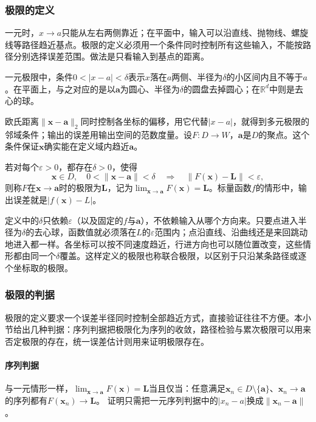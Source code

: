 \subsubsection{极限的定义}
\label{sec:multivariable-joint-limits}

一元时，$x\to a$只能从左右两侧靠近；在平面中，输入可以沿直线、抛物线、螺旋线等路径趋近基点。极限的定义必须用一个条件同时控制所有这些输入，不能按路径分别选择误差范围。做法是只看输入到基点的距离。

一元极限中，条件$0<|x-a|<\delta$表示$x$落在$a$两侧、半径为$\delta$的小区间内且不等于$a$。在平面上，与之对应的是以$\bm a$为圆心、半径为$\delta$的圆盘去掉圆心；在$\mathbb R^d$中则是去心的球。

欧氏距离$\lVert\bm x-\bm a\rVert_2$同时控制各坐标的偏移，用它代替$|x-a|$，就得到多元极限的邻域条件；输出的误差用输出空间的范数度量。设$F:D\to W$，$\bm a$是$D$的聚点。这个条件保证$\bm x$确实能在定义域内趋近$\bm a$。
\begin{definition}[映射的极限]
\label{def:multivariable-limit}
若对每个$\varepsilon>0$，都存在$\delta>0$，使得
\[
 \bm x\in D,\quad 0<\lVert\bm x-\bm a\rVert<\delta
 \quad\Longrightarrow\quad \lVert F(\bm x)-\bm L\rVert<\varepsilon,
\]
则称$F$在$\bm x\to\bm a$时的极限为$\bm L$，记为$\lim_{\bm x\to\bm a}F(\bm x)=\bm L$。标量函数$f$的情形中，输出误差就是$|f(\bm x)-L|$。
\end{definition}
定义中的$\delta$只依赖$\varepsilon$（以及固定的$f$与$\bm a$），不依赖输入从哪个方向来。只要点进入半径为$\delta$的去心球，函数值就必须落在$L$的$\varepsilon$范围内；点沿直线、沿曲线还是来回跳动地进入都一样。各坐标可以按不同速度趋近，行进方向也可以随位置改变，这些情形都由同一个$\delta$覆盖。这样定义的极限也称联合极限，以区别于只沿某条路径或逐个坐标取的极限。

\subsubsection{极限的判据}
\label{sec:multivariable-limit-criteria}

极限的定义要求一个误差半径同时控制全部趋近方式，直接验证往往不方便。本小节给出几种判据：序列判据把极限化为序列的收敛，路径检验与累次极限可以用来否定极限的存在，统一误差估计则用来证明极限存在。

\paragraph{序列判据}
与一元情形一样，$\lim_{\bm x\to\bm a}F(\bm x)=\bm L$当且仅当：任意满足$\bm x_n\in D\setminus\{\bm a\}$、$\bm x_n\to\bm a$的序列都有$F(\bm x_n)\to\bm L$。
证明只需把一元序列判据中的$|x_n-a|$换成$\lVert\bm x_n-\bm a\rVert$。

